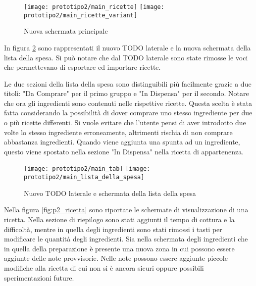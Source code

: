 \begin{figure}[ht]
  \begin{center}
    \texttt{[image: prototipo2/main\_ricette]}
    \texttt{[image: prototipo2/main\_ricette\_variant]}
    \caption{Nuova schermata principale}
    \label{fig:p2_main_ricette}
  \end{center}
\end{figure}

In figura \ref{fig:p2_main_lista_della_spesa} sono rappresentati il nuovo TODO laterale e la nuova schermata della lista della spesa.
Si può notare che dal TODO laterale sono state rimosse le voci che permettevano di esportare ed importare ricette.

Le due sezioni della lista della spesa sono distinguibili più facilmente grazie a due titoli: "Da Comprare" per il primo gruppo e "In Dispensa" per il secondo.
Notare che ora gli ingredienti sono contenuti nelle rispettive ricette.
Questa scelta è stata fatta considerando la possibilità di dover comprare uno stesso ingrediente per due o più ricette differenti.
Si vuole evitare che l'utente pensi di aver introdotto due volte lo stesso ingrediente erroneamente, altrimenti rischia di non comprare abbastanza ingredienti.
Quando viene aggiunta una spunta ad un ingrediente, questo viene spostato nella sezione "In Dispensa" nella ricetta di appartenenza.

\begin{figure}[ht]
  \begin{center}
    \texttt{[image: prototipo2/main\_tab]}
    \texttt{[image: prototipo2/main\_lista\_della\_spesa]}
    \caption{Nuovo TODO laterale e schermata della lista della spesa}
    \label{fig:p2_main_lista_della_spesa}
  \end{center}
\end{figure}
\clearpage


Nella figura \ref{fig:p2_ricetta} sono riportate le schermate di visualizzazione di una ricetta.
Nella sezione di riepilogo sono stati aggiunti il tempo di cottura e la difficoltà, mentre in quella degli ingredienti sono stati rimossi i tasti per modificare le quantità degli ingredienti.
Sia nella schermata degli ingredienti che in quella della preparazione è presente una nuova zona in cui possono essere aggiunte delle note provvisorie.
Nelle note possono essere aggiunte piccole modifiche alla ricetta di cui non si è ancora sicuri oppure possibili sperimentazioni future.

